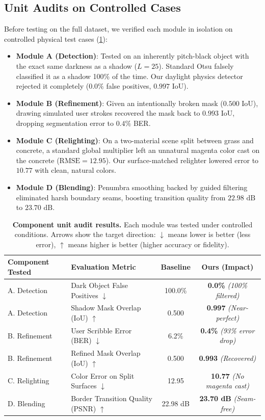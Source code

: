 \documentclass[10pt,twocolumn,letterpaper]{article}
\begin{document}
\subsection{Unit Audits on Controlled Cases}
Before testing on the full dataset, we verified each module in isolation on controlled physical test cases (\cref{tab:synthetic_audit}):
\begin{itemize}
    \item \textbf{Module A (Detection)}: Tested on an inherently pitch-black object with the exact same darkness as a shadow ($L = 25$). Standard Otsu falsely classified it as a shadow 100\% of the time. Our daylight physics detector rejected it completely ($0.0\%$ false positives, $0.997$ IoU).
    \item \textbf{Module B (Refinement)}: Given an intentionally broken mask ($0.500$ IoU), drawing simulated user strokes recovered the mask back to $0.993$ IoU, dropping segmentation error to $0.4\%$ BER.
    \item \textbf{Module C (Relighting)}: On a two-material scene split between grass and concrete, a standard global multiplier left an unnatural magenta color cast on the concrete ($\text{RMSE} = 12.95$). Our surface-matched relighter lowered error to $10.77$ with clean, natural colors.
    \item \textbf{Module D (Blending)}: Penumbra smoothing backed by guided filtering eliminated harsh boundary seams, boosting transition quality from $22.98\text{ dB}$ to $23.70\text{ dB}$.
\end{itemize}

\begin{table}[t]
\centering
\small
\begin{tabular}{@{}llcc@{}}
\toprule
\textbf{Component Tested} & \textbf{Evaluation Metric} & \textbf{Baseline} & \textbf{Ours (Impact)} \\
\midrule
A. Detection & Dark Object False Positives $\downarrow$ & 100.0\% & \textbf{0.0\%} \textit{(100\% filtered)} \\
A. Detection & Shadow Mask Overlap (IoU) $\uparrow$ & 0.500 & \textbf{0.997} \textit{(Near-perfect)} \\
B. Refinement & User Scribble Error (BER) $\downarrow$ & 6.2\% & \textbf{0.4\%} \textit{(93\% error drop)} \\
B. Refinement & Refined Mask Overlap (IoU) $\uparrow$ & 0.500 & \textbf{0.993} \textit{(Recovered)} \\
C. Relighting & Color Error on Split Surfaces $\downarrow$ & 12.95 & \textbf{10.77} \textit{(No magenta cast)} \\
D. Blending & Border Transition Quality (PSNR) $\uparrow$ & 22.98 dB & \textbf{23.70 dB} \textit{(Seam-free)} \\
\bottomrule
\end{tabular}
\caption{\textbf{Component unit audit results.} Each module was tested under controlled conditions. Arrows show the target direction: $\downarrow$ means lower is better (less error), $\uparrow$ means higher is better (higher accuracy or fidelity).}
\label{tab:synthetic_audit}
\end{table}
\end{document}
